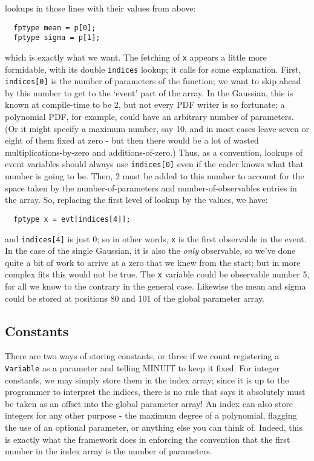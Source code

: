 \documentclass[12pt,pdflatex]{article}
\begin{document}
lookups in those lines with their values from above:
\begin{verbatim}
  fptype mean = p[0];
  fptype sigma = p[1]; 
\end{verbatim}
which is exactly what we want. The fetching of \verb|x| appears a little
more formidable, with its double \verb|indices| lookup; it calls for
some explanation. First, \verb|indices[0]| is the number of parameters
of the function; we want to skip ahead by this number to get to the `event'
part of the array. In the Gaussian, this is known at compile-time to be
2, but not every PDF writer is so fortunate; a polynomial PDF, for example,
could have an arbitrary number of parameters. (Or it might specify a maximum
number, say 10, and in most cases leave seven or eight of them fixed at zero - 
but then there would be a lot of wasted multiplications-by-zero and additions-of-zero.) 
Thus, as a convention, lookups of event variables should always use 
\verb|indices[0]| even if the coder knows what that number is going to be.
Then, 2 must be added to this number to account for the space taken
by the number-of-parameters and number-of-observables entries in the array.
So, replacing the first level of lookup by the values, we have:
\begin{verbatim}
  fptype x = evt[indices[4]]; 
\end{verbatim}
and \verb|indices[4]| is just 0; so in other words, \verb|x| is the first
observable in the event. In the case of the single Gaussian, it is
also the \emph{only} observable, so we've done quite a bit of work to
arrive at a zero that we knew from the start; but in more complex fits this would not be true. 
The \verb|x| variable could be observable number 5, for all we know
to the contrary in the general case. Likewise the mean and sigma
could be stored at positions 80 and 101 of the global parameter array. 

\subsection{Constants}

There are two ways of storing constants, or three if we count
registering a \texttt{Variable} as a parameter and telling MINUIT to keep
it fixed. For integer constants, we may simply store them in the
index array; since it is up to the programmer to interpret the
indices, there is no rule that says it absolutely must be taken
as an offset into the global parameter array! An index can also
store integers for any other purpose - the maximum degree of a 
polynomial, flagging the use of an optional parameter, or anything
else you can think of. Indeed, this is exactly
what the framework does in enforcing the convention that the first
number in the index array is the number of parameters. 
\end{document}

